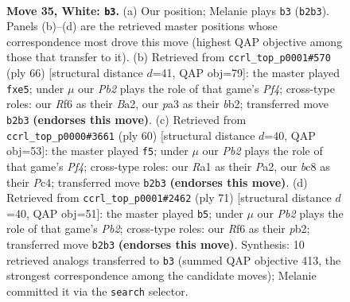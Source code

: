 \documentclass[11pt]{article}
\begin{document}
\clearpage

\begin{figure}[p]\centering
\begin{subfigure}{0.46\textwidth}\centering
\resizebox{\linewidth}{!}{%
\newchessgame
\chessboard[
  setfen={rnb1k3/8/5R2/3p4/1p6/p3B3/PPP3PK/RN6 w - - 0 35},
  showmover=false,
  pgfstyle=straightmove, color=movearrow, markmove={b2-b3}
]}
\caption{}
\end{subfigure}\hfill
\begin{subfigure}{0.46\textwidth}\centering
\resizebox{\linewidth}{!}{%
\newchessgame
\chessboard[
  setfen={3r1k2/7p/2p3p1/4p3/p4PP1/P3R1P1/BbP1K3/8 w - - 0 34},
  showmover=false,
  pgfstyle=straightmove, color=movearrow, markmove={f4-e5}
]}
\caption{}
\end{subfigure}
\\[4pt]
\begin{subfigure}{0.46\textwidth}\centering
\resizebox{\linewidth}{!}{%
\newchessgame
\chessboard[
  setfen={7r/5k1p/p1n2p2/3N2p1/2PpRPP1/8/P3K2P/8 w - - 1 31},
  showmover=false,
  pgfstyle=straightmove, color=movearrow, markmove={f4-f5}
]}
\caption{}
\end{subfigure}\hfill
\begin{subfigure}{0.46\textwidth}\centering
\resizebox{\linewidth}{!}{%
\newchessgame
\chessboard[
  setfen={8/pp6/P5k1/3r1np1/4p3/2B1P3/1P3PK1/R7 b - - 0 36},
  showmover=false,
  pgfstyle=straightmove, color=movearrow, markmove={b7-b5}
]}
\caption{}
\end{subfigure}
\caption{\textbf{Move 35, White: \texttt{b3}.} (a) Our position; Melanie plays \texttt{b3} (\texttt{b2b3}). Panels (b)--(d) are the retrieved master positions whose correspondence most drove this move (highest QAP objective among those that transfer to it). (b) Retrieved from \texttt{ccrl\_top\_p0001\#570} (ply 66) [structural distance $d$=41, QAP obj=79]: the master played \texttt{fxe5}; under $\mu$ our \emph{Pb2} plays the role of that game's \emph{Pf4}; cross-type roles: our \emph{R}f6 as their \emph{B}a2, our \emph{p}a3 as their \emph{b}b2; transferred move \texttt{b2b3} \textbf{(endorses this move)}. (c) Retrieved from \texttt{ccrl\_top\_p0000\#3661} (ply 60) [structural distance $d$=40, QAP obj=53]: the master played \texttt{f5}; under $\mu$ our \emph{Pb2} plays the role of that game's \emph{Pf4}; cross-type roles: our \emph{R}a1 as their \emph{P}a2, our \emph{b}c8 as their \emph{P}c4; transferred move \texttt{b2b3} \textbf{(endorses this move)}. (d) Retrieved from \texttt{ccrl\_top\_p0001\#2462} (ply 71) [structural distance $d$=40, QAP obj=51]: the master played \texttt{b5}; under $\mu$ our \emph{Pb2} plays the role of that game's \emph{Pb2}; cross-type roles: our \emph{R}f6 as their \emph{p}b2; transferred move \texttt{b2b3} \textbf{(endorses this move)}. Synthesis: 10 retrieved analogs transferred to \texttt{b3} (summed QAP objective 413, the strongest correspondence among the candidate moves); Melanie committed it via the \texttt{search} selector.}
\label{fig:thought-m68}
\end{figure}
\end{document}
